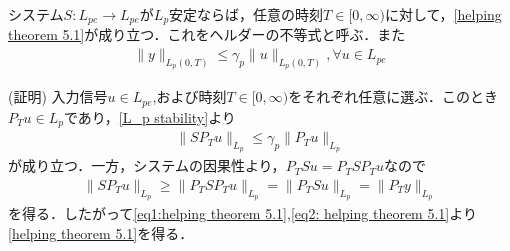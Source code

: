\documentclass[a4paper,11pt,uplatex]{jsarticle} %
\theoremstyle{definition}	%
\begin{document}
\begin{tcolorbox}[title=補題5.1,
drop small lifted shadow=black]
システム$S: L_{pe} \to L_{pe}$が$L_p$安定ならば，任意の時刻$T \in [0, \infty )$に対して，\eqref{helping theorem 5.1}が成り立つ．これをヘルダーの不等式と呼ぶ．また
\begin{align}
\label{helping theorem 5.1}
\| y \|_{L_p (0, T)} \leq \gamma_p \| u \|_{L_p (0, T)}, \forall u \in L_{pe}
\end{align}

(証明) 入力信号$u \in L_{pe}$,および時刻$T \in [0, \infty)$をそれぞれ任意に選ぶ．このとき$P_T u \in L_p$であり，\eqref{L_p stability}より
\begin{align}
\label{eq1:helping theorem 5.1}
\| S P_T u \|_{L_p} \leq \gamma_p \| P_T u \|_{L_p}
\end{align}
が成り立つ．一方，システムの因果性より，$P_T S u = P_T S P_T u $なので
\begin{align}
\label{eq2: helping theorem 5.1}
\| S P_T u \|_{L_p} \geq \| P_T S P_T u \|_{L_p} = \| P_T S u \|_{L_p} = \| P_T y \|_{L_p}
\end{align}
を得る．したがって\eqref{eq1:helping theorem 5.1},\eqref{eq2: helping theorem 5.1}より\eqref{helping theorem 5.1}を得る．
\end{tcolorbox}



\end{document}
